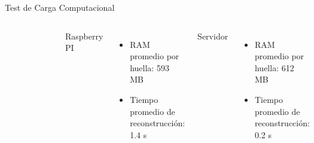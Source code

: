 \documentclass[12pt,aspectratio=169]{beamer}
\begin{document}
\begin{frame}{Test de Carga Computacional}
\begin{columns}[c]
\begin{figure}
            \end{figure}
            Raspberry PI\\
            \begin{itemize}
            \item RAM promedio por huella: 593 MB
            \item Tiempo promedio de reconstrucción: 1.4 s
            \end{itemize}
            Servidor\\
            \begin{itemize}
            \item RAM promedio por huella: 612 MB
            \item Tiempo promedio de reconstrucción: 0.2 s
            \end{itemize}
    \end{columns}

\end{frame}
\end{document}
